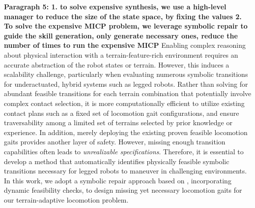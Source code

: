\documentclass[letterpaper, 10 pt, conference]{ieeeconf}
\begin{document}
\textbf{Paragraph 5: 1. to solve expensive synthesis, we use a high-level manager to reduce the size of the state space, by fixing the values 
2. To solve the expensive MICP problem, we leverage symbolic repair to guide the skill generation, only generate necessary ones, reduce the number of times to run the expensive MICP}
Enabling complex reasoning about physical interaction with a terrain-feature-rich environment requires an accurate abstraction of the robot states or terrain. However, this induces a scalability challenge, particularly when evaluating numerous symbolic transitions for underactuated, hybrid systems such as legged robots. Rather than solving for abundant feasible transitions \cite{bhatia2010sampling,liu2013synthesis,maly2013iterative,gu2022reactive} for each terrain combination that potentially involve complex contact selection, it is more computationally efficient to utilize existing contact plans such as a fixed set of locomotion gait configurations, and ensure traversability among a limited set of terrains selected by prior knowledge or experience. In addition, merely deploying the existing proven feasible locomotion gaits provides another layer of safety.
However, missing enough transition capabilities
often leads to \textit{unrealizable specifications}. Therefore, it is essential to develop a method that automatically identifies physically feasible symbolic transitions necessary for legged robots to maneuver in challenging environments. In this work, we adopt a symbolic repair approach based on \cite{pacheck2022physically}, incorporating dynamic feasibility checks, to design missing yet necessary locomotion gaits for our terrain-adaptive locomotion problem.
\end{document}
